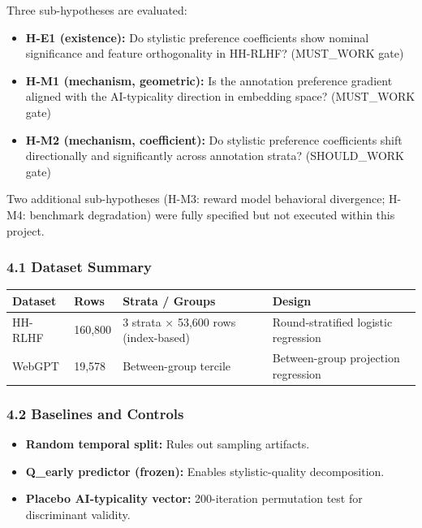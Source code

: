 
Three sub-hypotheses are evaluated:

\begin{itemize}
\item \textbf{H-E1 (existence):} Do stylistic preference coefficients show nominal significance and feature orthogonality in HH-RLHF? (MUST_WORK gate)
\item \textbf{H-M1 (mechanism, geometric):} Is the annotation preference gradient aligned with the AI-typicality direction in embedding space? (MUST_WORK gate)
\item \textbf{H-M2 (mechanism, coefficient):} Do stylistic preference coefficients shift directionally and significantly across annotation strata? (SHOULD_WORK gate)
\end{itemize}

Two additional sub-hypotheses (H-M3: reward model behavioral divergence; H-M4: benchmark degradation) were fully specified but not executed within this project.

\subsubsection{4.1 Dataset Summary}

\begin{table}[htbp]
\centering
\begin{tabular}{llll}
\toprule
Dataset & Rows & Strata / Groups & Design \\
\midrule
HH-RLHF & 160,800 & 3 strata × 53,600 rows (index-based) & Round-stratified logistic regression \\
WebGPT & 19,578 & Between-group tercile & Between-group projection regression \\
\bottomrule
\end{tabular}
\end{table}

\subsubsection{4.2 Baselines and Controls}

\begin{itemize}
\item \textbf{Random temporal split:} Rules out sampling artifacts.
\item \textbf{Q_early predictor (frozen):} Enables stylistic-quality decomposition.
\item \textbf{Placebo AI-typicality vector:} 200-iteration permutation test for discriminant validity.
\end{itemize}

